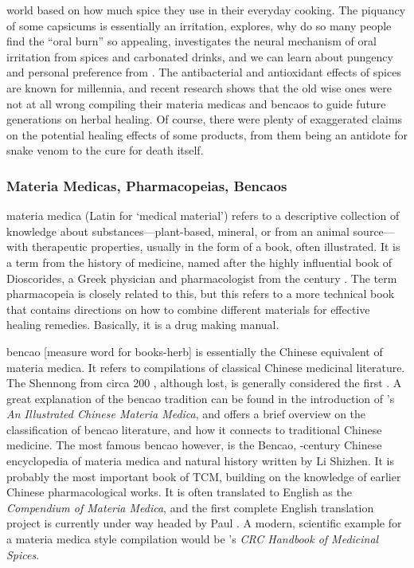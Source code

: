 world based on how much spice they use in their everyday cooking. The piquancy of some capsicums is essentially an irritation, \textcite{spence_why_2018} explores, why do so many people find the ``oral burn'' so appealing, \textcite{carstens_it_2002} investigates the neural mechanism of oral irritation from spices and carbonated drinks, and we can learn about pungency and personal preference from \textcite{prescott_pungency_1995}. The antibacterial and antioxidant effects of spices are known for millennia, and recent research \autocite{billing_antimicrobial_1998,nilius_spices_2013,yashin_antioxidant_2017} shows that the old wise ones were not at all wrong compiling their \glspl{materia medica} and \glspl{bencao} to guide future generations on herbal healing. Of course, there were plenty of exaggerated claims on the potential healing effects of some products, from them being an antidote for snake venom to the cure for death itself.

\subsubsection{Materia Medicas, Pharmacopeias, Bencaos}

\Gls{materia medica} (Latin for `medical material') refers to a descriptive collection of knowledge about substances---plant-based, mineral, or from an animal source---with therapeutic properties, usually in the form of a book, often illustrated. It is a term from the history of medicine, named after the highly influential book of Dioscorides, a Greek physician and pharmacologist from the  century \AD{}. The term \gls{pharmacopeia} is closely related to this, but this refers to a more technical book that contains directions on how to combine different materials for effective healing remedies. Basically, it is a drug making manual.

\Gls{bencao}  [measure word for books-herb] is essentially the Chinese equivalent of materia medica. It refers to compilations of classical Chinese medicinal literature. The \gls{Shennong} from circa 200 \AD, although lost, is generally considered the first \autocites[see][]{nugent-head_first_2014}{yang_divine_1998}. A great explanation of the \gls{bencao} tradition can be found in the introduction of \textcite{wu_illustrated_2005}'s \textit{An Illustrated Chinese Materia Medica}, and \textcite{zhao_concise_2018} offers a brief overview on the classification of \gls{bencao} literature, and how it connects to traditional Chinese medicine. The most famous \gls{bencao} however, is the \gls{Bencao}, -century Chinese encyclopedia of materia medica and natural history written by Li Shizhen. It is probably the most important book of \gls{TCM}, building on the knowledge of earlier Chinese pharmacological works. It is often translated to English as the \textit{Compendium of Materia Medica}, and the first complete English translation project is currently under way headed by Paul \textcite{unschuld_first_2022}. 
A modern, scientific example for a materia medica style compilation would be \textcite{duke_crc_2002}'s \textit{CRC Handbook of Medicinal Spices}.

